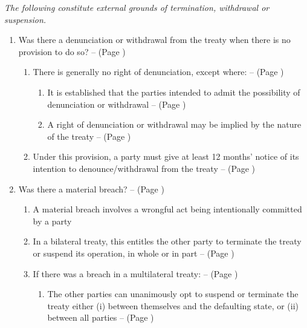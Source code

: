 \begin{enumerate}
\begin{enumerate}
\begin{enumerate}
        \end{enumerate}
    \end{enumerate}
    \textit{The following constitute external grounds of termination, withdrawal or suspension.}
    \begin{enumerate}[resume]
        \item Was there a denunciation or withdrawal from the treaty when there is no provision to do so? --  (Page \pageref{VCLT Art 56})
        \begin{enumerate}
            \item There is generally no right of denunciation, except where: --  (Page \pageref{VCLT Art 56})
            \begin{enumerate}
                \item It is established that the parties intended to admit the possibility of denunciation or withdrawal --  (Page \pageref{VCLT Art 56})
                \item A right of denunciation or withdrawal may be implied by the nature of the treaty --  (Page \pageref{VCLT Art 56})
            \end{enumerate}
            \item Under this provision, a party must give at least 12 months' notice of its intention to denounce/withdrawal from the treaty --  (Page \pageref{VCLT Art 56})
        \end{enumerate}
        \item Was there a material breach? --  (Page \pageref{VCLT Art 60})
        \begin{enumerate}
            \item A material breach involves a wrongful act being intentionally committed by a party
            \item In a bilateral treaty, this entitles the other party to terminate the treaty or suspend its operation, in whole or in part --  (Page \pageref{VCLT Art 60})
            \item If there was a breach in a multilateral treaty: --  (Page \pageref{VCLT Art 60})
            \begin{enumerate}
                \item The other parties can unanimously opt to suspend or terminate the treaty either (i) between themselves and the defaulting state, or (ii) between all parties --  (Page \pageref{VCLT Art 60})

\end{enumerate}
\end{enumerate}
\end{enumerate}
\end{enumerate}
